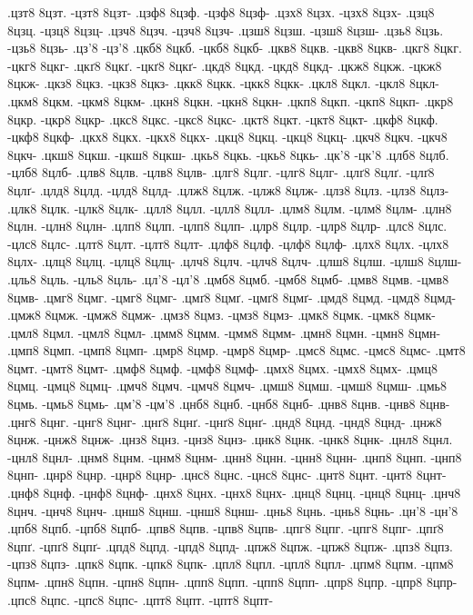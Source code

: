 {.цзт8 8цзт. -цзт8 8цзт-
.цзф8 8цзф. -цзф8 8цзф-
.цзх8 8цзх. -цзх8 8цзх-
.цзц8 8цзц. -цзц8 8цзц-
.цзч8 8цзч. -цзч8 8цзч-
.цзш8 8цзш. -цзш8 8цзш-
.цзь8 8цзь. -цзь8 8цзь-
.цз'8 -цз'8
.цкб8 8цкб. -цкб8 8цкб-
.цкв8 8цкв. -цкв8 8цкв-
.цкг8 8цкг. -цкг8 8цкг-
.цкґ8 8цкґ. -цкґ8 8цкґ-
.цкд8 8цкд. -цкд8 8цкд-
.цкж8 8цкж. -цкж8 8цкж-
.цкз8 8цкз. -цкз8 8цкз-
.цкк8 8цкк. -цкк8 8цкк-
.цкл8 8цкл. -цкл8 8цкл-
.цкм8 8цкм. -цкм8 8цкм-
.цкн8 8цкн. -цкн8 8цкн-
.цкп8 8цкп. -цкп8 8цкп-
.цкр8 8цкр. -цкр8 8цкр-
.цкс8 8цкс. -цкс8 8цкс-
.цкт8 8цкт. -цкт8 8цкт-
.цкф8 8цкф. -цкф8 8цкф-
.цкх8 8цкх. -цкх8 8цкх-
.цкц8 8цкц. -цкц8 8цкц-
.цкч8 8цкч. -цкч8 8цкч-
.цкш8 8цкш. -цкш8 8цкш-
.цкь8 8цкь. -цкь8 8цкь-
.цк'8 -цк'8
.цлб8 8цлб. -цлб8 8цлб-
.цлв8 8цлв. -цлв8 8цлв-
.цлг8 8цлг. -цлг8 8цлг-
.цлґ8 8цлґ. -цлґ8 8цлґ-
.цлд8 8цлд. -цлд8 8цлд-
.цлж8 8цлж. -цлж8 8цлж-
.цлз8 8цлз. -цлз8 8цлз-
.цлк8 8цлк. -цлк8 8цлк-
.цлл8 8цлл. -цлл8 8цлл-
.цлм8 8цлм. -цлм8 8цлм-
.цлн8 8цлн. -цлн8 8цлн-
.цлп8 8цлп. -цлп8 8цлп-
.цлр8 8цлр. -цлр8 8цлр-
.цлс8 8цлс. -цлс8 8цлс-
.цлт8 8цлт. -цлт8 8цлт-
.цлф8 8цлф. -цлф8 8цлф-
.цлх8 8цлх. -цлх8 8цлх-
.цлц8 8цлц. -цлц8 8цлц-
.цлч8 8цлч. -цлч8 8цлч-
.цлш8 8цлш. -цлш8 8цлш-
.цль8 8цль. -цль8 8цль-
.цл'8 -цл'8
.цмб8 8цмб. -цмб8 8цмб-
.цмв8 8цмв. -цмв8 8цмв-
.цмг8 8цмг. -цмг8 8цмг-
.цмґ8 8цмґ. -цмґ8 8цмґ-
.цмд8 8цмд. -цмд8 8цмд-
.цмж8 8цмж. -цмж8 8цмж-
.цмз8 8цмз. -цмз8 8цмз-
.цмк8 8цмк. -цмк8 8цмк-
.цмл8 8цмл. -цмл8 8цмл-
.цмм8 8цмм. -цмм8 8цмм-
.цмн8 8цмн. -цмн8 8цмн-
.цмп8 8цмп. -цмп8 8цмп-
.цмр8 8цмр. -цмр8 8цмр-
.цмс8 8цмс. -цмс8 8цмс-
.цмт8 8цмт. -цмт8 8цмт-
.цмф8 8цмф. -цмф8 8цмф-
.цмх8 8цмх. -цмх8 8цмх-
.цмц8 8цмц. -цмц8 8цмц-
.цмч8 8цмч. -цмч8 8цмч-
.цмш8 8цмш. -цмш8 8цмш-
.цмь8 8цмь. -цмь8 8цмь-
.цм'8 -цм'8
.цнб8 8цнб. -цнб8 8цнб-
.цнв8 8цнв. -цнв8 8цнв-
.цнг8 8цнг. -цнг8 8цнг-
.цнґ8 8цнґ. -цнґ8 8цнґ-
.цнд8 8цнд. -цнд8 8цнд-
.цнж8 8цнж. -цнж8 8цнж-
.цнз8 8цнз. -цнз8 8цнз-
.цнк8 8цнк. -цнк8 8цнк-
.цнл8 8цнл. -цнл8 8цнл-
.цнм8 8цнм. -цнм8 8цнм-
.цнн8 8цнн. -цнн8 8цнн-
.цнп8 8цнп. -цнп8 8цнп-
.цнр8 8цнр. -цнр8 8цнр-
.цнс8 8цнс. -цнс8 8цнс-
.цнт8 8цнт. -цнт8 8цнт-
.цнф8 8цнф. -цнф8 8цнф-
.цнх8 8цнх. -цнх8 8цнх-
.цнц8 8цнц. -цнц8 8цнц-
.цнч8 8цнч. -цнч8 8цнч-
.цнш8 8цнш. -цнш8 8цнш-
.цнь8 8цнь. -цнь8 8цнь-
.цн'8 -цн'8
.цпб8 8цпб. -цпб8 8цпб-
.цпв8 8цпв. -цпв8 8цпв-
.цпг8 8цпг. -цпг8 8цпг-
.цпґ8 8цпґ. -цпґ8 8цпґ-
.цпд8 8цпд. -цпд8 8цпд-
.цпж8 8цпж. -цпж8 8цпж-
.цпз8 8цпз. -цпз8 8цпз-
.цпк8 8цпк. -цпк8 8цпк-
.цпл8 8цпл. -цпл8 8цпл-
.цпм8 8цпм. -цпм8 8цпм-
.цпн8 8цпн. -цпн8 8цпн-
.цпп8 8цпп. -цпп8 8цпп-
.цпр8 8цпр. -цпр8 8цпр-
.цпс8 8цпс. -цпс8 8цпс-
.цпт8 8цпт. -цпт8 8цпт-
}
